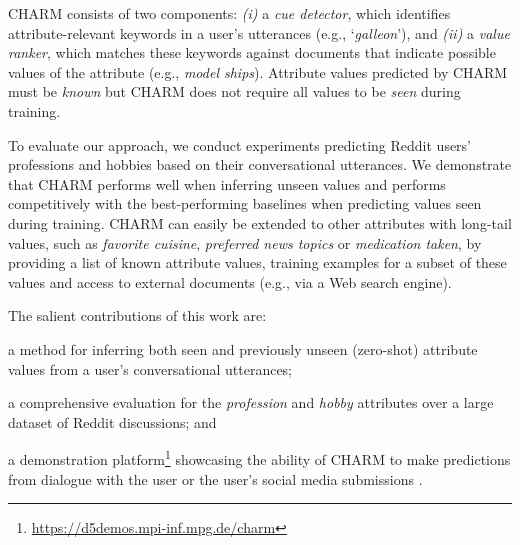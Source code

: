 CHARM consists of two components: \emph{(i)} a \textit{cue detector}, which identifies attribute-relevant keywords in a user's utterances 
(e.g., `\textit{galleon}'), and \emph{(ii)} a \textit{value ranker}, which matches these keywords against documents that indicate possible values of the attribute (e.g., \textit{model ships}). 
Attribute values predicted by CHARM must be \textit{known} but CHARM does not require all values to be \textit{seen} during training. 

To evaluate our approach, we conduct experiments predicting Reddit users' professions and hobbies based on their conversational utterances. We demonstrate that CHARM performs well when inferring unseen values and performs competitively with the best-performing baselines when 
predicting values seen during training. 
CHARM can easily be extended to other attributes with long-tail values, such as 
{\em favorite cuisine}, {\em preferred news topics} or {\em medication taken}, by providing a list of known attribute values, training examples for a subset of these values and access to external documents (e.g., via a Web search engine).

\vspace{0.1cm}
The salient contributions of this work are:
\squishlist
    \item a method for inferring both seen and previously unseen (zero-shot) attribute values from a user's conversational utterances;
    \item a comprehensive evaluation 
    for the \textit{profession} and \textit{hobby} attributes over a large dataset of Reddit discussions;
and \item a demonstration platform\footnote{\href{https://d5demos.mpi-inf.mpg.de/charm}{https://d5demos.mpi-inf.mpg.de/charm}} showcasing the ability of CHARM to make predictions from dialogue with the user or the user's social media submissions \cite{tigunova2021exploring}.
\squishend
